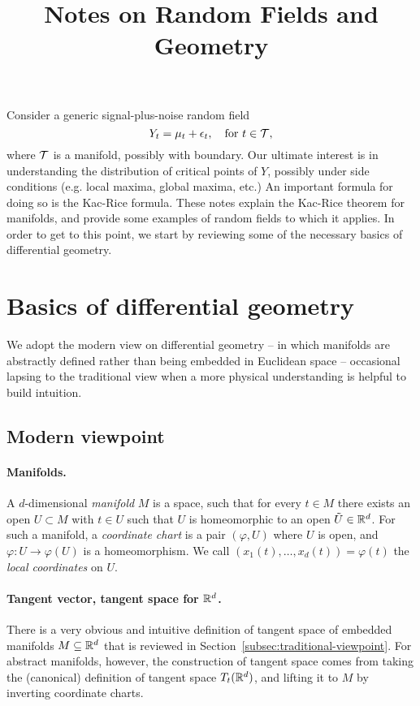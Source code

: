 \documentclass{article}
\title{ {\bf Notes on Random Fields and Geometry} }
\begin{document}
	
	\maketitle
	\RaggedRight
	
	Consider a generic signal-plus-noise random field
	\begin{equation}
		\label{eqn:signal-plus-noise}
		Y_t = \mu_t + \epsilon_t, \quad {\rm for} ~ t \in \mathcal{T},
	\end{equation}
	where $\mathcal{T}$ is a manifold, possibly with boundary. Our ultimate interest is in understanding the distribution of critical points of $Y$, possibly under side conditions (e.g. local maxima, global maxima, etc.) An important formula for doing so is the Kac-Rice formula. These notes explain the Kac-Rice theorem for manifolds, and provide some examples of random fields to which it applies. In order to get to this point, we start by reviewing some of the necessary basics of differential geometry.
	
	\section{Basics of differential geometry}
	
	We adopt the modern view on differential geometry -- in which manifolds are abstractly defined rather than being  embedded in Euclidean space -- occasional lapsing to the traditional view when a more physical understanding is helpful to build intuition. 
	
	\subsection{Modern viewpoint}
	  
	\paragraph{Manifolds.}
	A $d$-dimensional \emph{manifold} $M$ is a  space, such that for every $t \in M$ there exists an open $U \subset M$ with $t \in U$ such that $U$ is homeomorphic to an open $\tilde{U} \in \mathbb{R}^d$. For such a manifold, a \emph{coordinate chart} is a pair $(\varphi,U)$ where $U$ is open, and $\varphi: U \to \varphi(U)$ is a homeomorphism. We call $(x_1(t),\ldots,x_d(t)) = \varphi(t)$ the \emph{local coordinates} on $U$.
	
	\paragraph{Tangent vector, tangent space for $\mathbb{R}^d$.}
	There is a very obvious and intuitive definition of tangent space of embedded manifolds $M \subseteq \mathbb{R}^d$ that is reviewed in Section~\ref{subsec:traditional-viewpoint}. For abstract manifolds, however, the construction of tangent space comes from taking the (canonical) definition of tangent space $T_t(\mathbb{R}^d)$, and lifting it to $M$ by inverting coordinate charts. 
	
\end{document}
